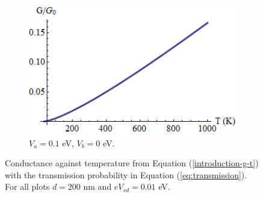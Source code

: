 \documentclass[12pt,a4paper]{report}
\begin{document}
\begin{figure}[h]
\begin{subfigure}[h]{0.3\textwidth}
				\centerline{\includegraphics[scale=0.35]{images/pot-t-3}}
				\caption{$V_{a}=0.1$ eV, $V_{b}=0$ eV.}
			\end{subfigure}
			\caption{Conductance against temperature from Equation (\ref{introduction-g-t}) with the transmission probability in Equation (\ref{eq:transmission}). For all plots $d=200$ nm and $eV_{sd}=0.01$ eV.}
			\label{pot-t-1}
		\end{figure}
\end{document}
